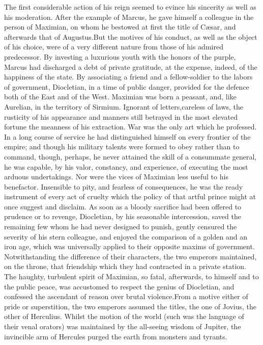 The first considerable action of his reign seemed to evince his
sincerity as well as his moderation. After the example of Marcus,
he gave himself a colleague in the person of Maximian, on whom he
bestowed at first the title of Cæsar, and afterwards that of
Augustus.\footnotemark[6] But the motives of his conduct, as well as the object
of his choice, were of a very different nature from those of his
admired predecessor. By investing a luxurious youth with the
honors of the purple, Marcus had discharged a debt of private
gratitude, at the expense, indeed, of the happiness of the state.
By associating a friend and a fellow-soldier to the labors of
government, Diocletian, in a time of public danger, provided for
the defence both of the East and of the West. Maximian was born a
peasant, and, like Aurelian, in the territory of Sirmium.
Ignorant of letters,\footnotemark[7] careless of laws, the rusticity of his
appearance and manners still betrayed in the most elevated
fortune the meanness of his extraction. War was the only art
which he professed. In a long course of service he had
distinguished himself on every frontier of the empire; and though
his military talents were formed to obey rather than to command,
though, perhaps, he never attained the skill of a consummate
general, he was capable, by his valor, constancy, and experience,
of executing the most arduous undertakings. Nor were the vices of
Maximian less useful to his benefactor. Insensible to pity, and
fearless of consequences, he was the ready instrument of every
act of cruelty which the policy of that artful prince might at
once suggest and disclaim. As soon as a bloody sacrifice had been
offered to prudence or to revenge, Diocletian, by his seasonable
intercession, saved the remaining few whom he had never designed
to punish, gently censured the severity of his stern colleague,
and enjoyed the comparison of a golden and an iron age, which was
universally applied to their opposite maxims of government.
Notwithstanding the difference of their characters, the two
emperors maintained, on the throne, that friendship which they
had contracted in a private station. The haughty, turbulent
spirit of Maximian, so fatal, afterwards, to himself and to the
public peace, was accustomed to respect the genius of Diocletian,
and confessed the ascendant of reason over brutal violence.\footnotemark[8]
From a motive either of pride or superstition, the two emperors
assumed the titles, the one of Jovius, the other of Herculius.
Whilst the motion of the world (such was the language of their
venal orators) was maintained by the all-seeing wisdom of
Jupiter, the invincible arm of Hercules purged the earth from
monsters and tyrants.\footnotemark[9]

